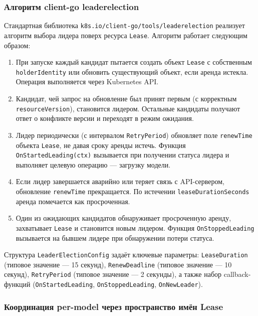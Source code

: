 \subsubsection*{Алгоритм client-go leaderelection}

Стандартная библиотека \texttt{k8s.io/client-go/tools/leaderelection} реализует алгоритм выбора лидера поверх ресурса \texttt{Lease}. Алгоритм работает следующим образом:

\begin{enumerate}[leftmargin=*]
  \item При запуске каждый кандидат пытается создать объект \texttt{Lease} с собственным \texttt{holderIdentity} или обновить существующий объект, если аренда истекла. Операция выполняется через Kubernetes API.
  \item Кандидат, чей запрос на обновление был принят первым (с корректным \texttt{resourceVersion}), становится лидером. Остальные кандидаты получают ответ о конфликте версии и переходят в режим ожидания.
  \item Лидер периодически (с интервалом \texttt{RetryPeriod}) обновляет поле \texttt{renewTime} объекта \texttt{Lease}, не давая сроку аренды истечь. Функция \texttt{OnStartedLeading(ctx)} вызывается при получении статуса лидера и выполняет целевую операцию --- загрузку модели.
  \item Если лидер завершается аварийно или теряет связь с API-сервером, обновление \texttt{renewTime} прекращается. По истечении \texttt{leaseDurationSeconds} аренда помечается как просроченная.
  \item Один из ожидающих кандидатов обнаруживает просроченную аренду, захватывает \texttt{Lease} и становится новым лидером. Функция \texttt{OnStoppedLeading} вызывается на бывшем лидере при обнаружении потери статуса.
\end{enumerate}

Структура \texttt{LeaderElectionConfig} задаёт ключевые параметры: \texttt{LeaseDuration} (типовое значение --- 15 секунд), \texttt{RenewDeadline} (типовое значение --- 10 секунд), \texttt{RetryPeriod} (типовое значение --- 2 секунды), а также набор callback-функций (\texttt{OnStartedLeading}, \texttt{OnStoppedLeading}, \texttt{OnNewLeader}).

\subsubsection*{Координация per-model через пространство имён Lease}

